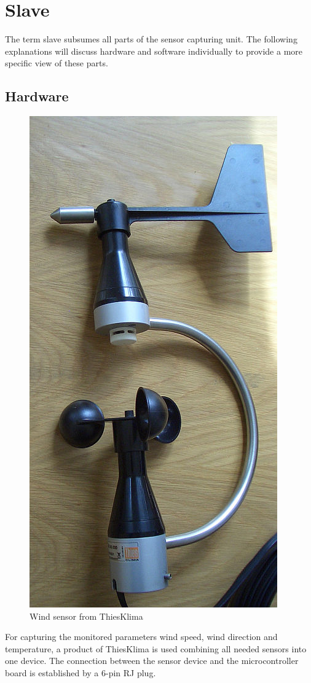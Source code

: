 
\chapter{Slave}

The term slave subsumes all parts of the sensor capturing unit.
The following explanations will discuss hardware and software individually to provide a more specific view of these parts.

\section{Hardware}

\begin{figure}[ht]
    \centering
    \includegraphics[width=0.6\linewidth]{graphics/windsensor.jpg}
    \caption{Wind sensor from ThiesKlima}
    \label{fig:windsensor}
\end{figure}

For capturing the monitored parameters wind speed, wind direction and temperature, a product of ThiesKlima is used combining all needed sensors into one device. The connection between the sensor device and the microcontroller board is established by a 6-pin RJ plug.

